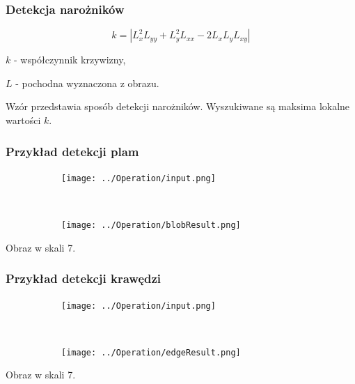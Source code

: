 \begin{frame}
	\frametitle{Detekcja narożników}



	$$ k = |L_x^2L_{yy}  + L_y^2L_{xx} - 2L_xL_yL_{xy}| $$

	$ k $ - współczynnik krzywizny,

	$ L $ - pochodna wyznaczona z obrazu.


	Wzór przedstawia sposób detekcji narożników. Wyszukiwane są maksima lokalne wartości $ k $.


\end{frame}
\begin{frame}
	\frametitle{Przykład detekcji plam}
	\begin{figure}[h]
		\begin{center}

			\begin{subfigure}[b]{5cm}
				\centering
				\texttt{[image: ../Operation/input.png]}
			\end{subfigure}~
			\begin{subfigure}[b]{5cm}
				\centering
				\texttt{[image: ../Operation/blobResult.png]}
			\end{subfigure}
		\end{center}
	\end{figure}
	
Obraz w skali 7.
	
\end{frame}
\begin{frame}
	\frametitle{Przykład detekcji krawędzi}
	\begin{figure}[h]
		\begin{center}

			\begin{subfigure}[b]{5cm}
				\centering
				\texttt{[image: ../Operation/input.png]}
			\end{subfigure}~
			\begin{subfigure}[b]{5cm}
				\centering
				\texttt{[image: ../Operation/edgeResult.png]}
			\end{subfigure}
			
					\end{center}
	\end{figure}
	
	Obraz w skali 7.
\end{frame}

